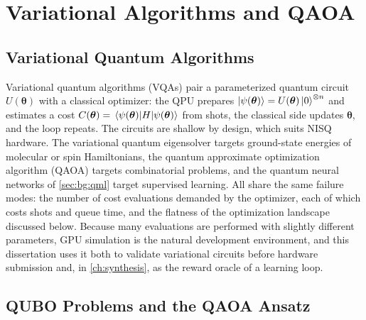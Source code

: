 \section{Variational Algorithms and QAOA}\label{sec:bg:vqa}

\subsection{Variational Quantum Algorithms}

Variational quantum algorithms (VQAs) \cite{cerezo2021vqa} pair a parameterized quantum circuit $U(\bm{\theta})$ with a classical optimizer: the QPU prepares $\ket{\psi(\bm{\theta})}=U(\bm{\theta})\ket{0}^{\otimes n}$ and estimates a cost $C(\bm{\theta})=\expval{H}{\psi(\bm{\theta})}$ from shots, the classical side updates $\bm{\theta}$, and the loop repeats. The circuits are shallow by design, which suits NISQ hardware. The variational quantum eigensolver targets ground-state energies of molecular or spin Hamiltonians, the quantum approximate optimization algorithm (QAOA) targets combinatorial problems, and the quantum neural networks of \cref{sec:bg:qml} target supervised learning. All share the same failure modes: the number of cost evaluations demanded by the optimizer, each of which costs shots and queue time, and the flatness of the optimization landscape discussed below. Because many evaluations are performed with slightly different parameters, GPU simulation is the natural development environment, and this dissertation uses it both to validate variational circuits before hardware submission and, in \cref{ch:synthesis}, as the reward oracle of a learning loop.

\subsection{QUBO Problems and the QAOA Ansatz}


